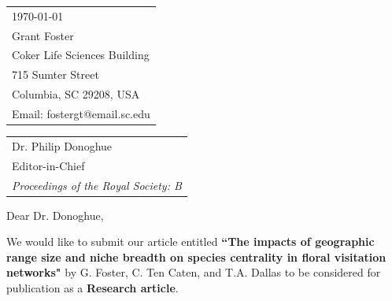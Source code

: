 \documentclass{article}
\begin{document}



\hfill
\begin{tabular}{l @{}}
	\today \bigskip\\ %
	Grant Foster \\
	Coker Life Sciences Building \\
    715 Sumter Street \\
    Columbia, SC 29208, USA\\ %
	Email: fostergt@email.sc.edu
\end{tabular}

\bigskip %


\begin{tabular}{@{} l}
    Dr. Philip Donoghue \\
	Editor-in-Chief \\
	\emph{Proceedings of the Royal Society: B} \\
\end{tabular}

\bigskip %

Dear Dr. Donoghue,

\bigskip %

We would like to submit our article entitled \textbf{``The impacts of geographic range size and niche breadth on species centrality in floral visitation networks"} by G. Foster, C. Ten Caten, and  T.A. Dallas to be considered for publication as a \textbf{Research article}. \\
\end{document}
